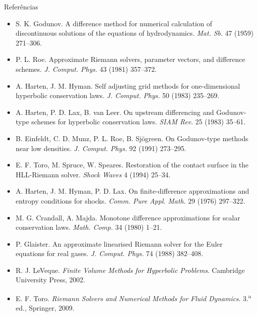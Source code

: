 \documentclass[aspectratio=169,10pt]{beamer}
\begin{document}
\begin{frame}{Referências}
\footnotesize
\begin{itemize}
\item S. K. Godunov. A difference method for numerical calculation of discontinuous solutions of the equations of hydrodynamics. \emph{Mat. Sb.} 47 (1959) 271--306.
\item P. L. Roe. Approximate Riemann solvers, parameter vectors, and difference schemes. \emph{J. Comput. Phys.} 43 (1981) 357--372.
\item A. Harten, J. M. Hyman. Self adjusting grid methods for one-dimensional hyperbolic conservation laws. \emph{J. Comput. Phys.} 50 (1983) 235--269.
\item A. Harten, P. D. Lax, B. van Leer. On upstream differencing and Godunov-type schemes for hyperbolic conservation laws. \emph{SIAM Rev.} 25 (1983) 35--61.
\item B. Einfeldt, C. D. Munz, P. L. Roe, B. Sjögreen. On Godunov-type methods near low densities. \emph{J. Comput. Phys.} 92 (1991) 273--295.
\item E. F. Toro, M. Spruce, W. Speares. Restoration of the contact surface in the HLL-Riemann solver. \emph{Shock Waves} 4 (1994) 25--34.
\item A. Harten, J. M. Hyman, P. D. Lax. On finite-difference approximations and entropy conditions for shocks. \emph{Comm. Pure Appl. Math.} 29 (1976) 297--322.
\item M. G. Crandall, A. Majda. Monotone difference approximations for scalar conservation laws. \emph{Math. Comp.} 34 (1980) 1--21.
\item P. Glaister. An approximate linearised Riemann solver for the Euler equations for real gases. \emph{J. Comput. Phys.} 74 (1988) 382--408.
\item R. J. LeVeque. \emph{Finite Volume Methods for Hyperbolic Problems}. Cambridge University Press, 2002.
\item E. F. Toro. \emph{Riemann Solvers and Numerical Methods for Fluid Dynamics}. 3.\textsuperscript{a} ed., Springer, 2009.
\end{itemize}
\end{frame}
\end{document}
